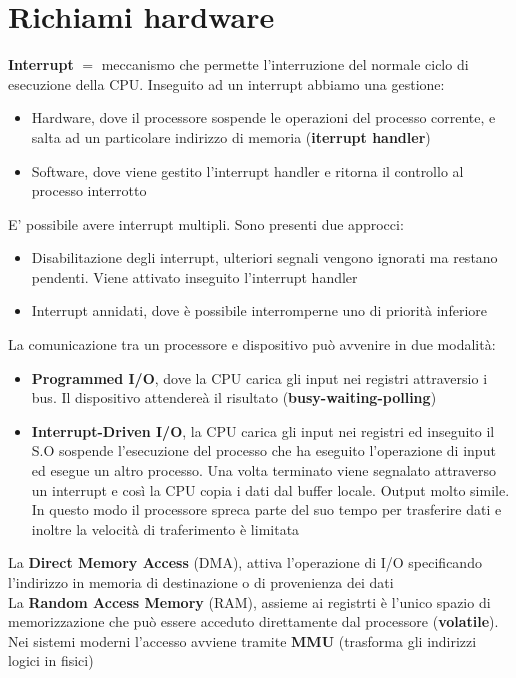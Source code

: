 \documentclass{article}
\begin{document}
\section{Richiami hardware}
\textbf{Interrupt} $=$ meccanismo che permette l'interruzione del normale ciclo di esecuzione della CPU. Inseguito ad un interrupt abbiamo una gestione:
\begin{itemize}
  \item Hardware, dove il processore sospende le operazioni del processo corrente, e salta ad un particolare indirizzo di memoria (\textbf{iterrupt handler})
  \item Software, dove viene gestito l'interrupt handler e ritorna il controllo al processo interrotto
\end{itemize}
E' possibile avere interrupt multipli. Sono presenti due approcci:
\begin{itemize}
  \item Disabilitazione degli interrupt, ulteriori segnali vengono ignorati ma restano pendenti. Viene attivato inseguito l'interrupt handler
  \item Interrupt annidati, dove è possibile interromperne uno di priorità inferiore
\end{itemize}
La comunicazione tra un processore e dispositivo può avvenire in due modalità:
\begin{itemize}
  \item \textbf{Programmed I/O}, dove la CPU carica gli input nei registri attraversio i bus. Il dispositivo attendereà il risultato (\textbf{busy-waiting-polling})
  \item \textbf{Interrupt-Driven I/O}, la CPU carica gli input nei registri ed inseguito il S.O sospende l'esecuzione del processo che ha eseguito l'operazione di input ed esegue un altro processo. Una volta terminato viene segnalato attraverso un interrupt e così la CPU copia i dati dal buffer locale. Output molto simile. In questo modo il processore spreca parte del suo tempo per trasferire dati e inoltre la velocità di traferimento è limitata
\end{itemize}
La \textbf{Direct Memory Access} (DMA), attiva l'operazione di I/O specificando l'indirizzo in memoria di destinazione o di provenienza dei dati\\
La \textbf{Random Access Memory} (RAM), assieme ai registrti è l'unico spazio di memorizzazione che può essere acceduto direttamente dal processore (\textbf{volatile}). Nei sistemi moderni l'accesso avviene tramite \textbf{MMU} (trasforma gli indirizzi logici in fisici)\\
\end{document}
